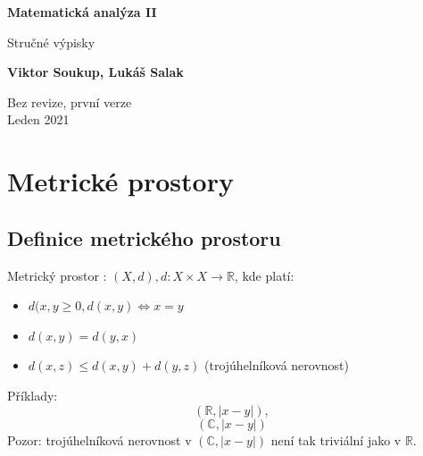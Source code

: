 \documentclass[10pt]{article}
\begin{document}
\begin{titlepage}
    \begin{center}
        \vspace*{1cm}
            
        \Huge
        \textbf{Matematická analýza II}
            
        \vspace{0.5cm}
        \LARGE
        Stručné výpisky
            
        \vspace{1.5cm}
            
        \textbf{Viktor Soukup, Lukáš Salak}
        
        \vfill
        \flushright
        \normalsize
        Bez revize, první verze \\
        Leden 2021
        
    \end{center}
\end{titlepage}

\tableofcontents
\clearpage

\section{Metrické prostory}
\subsection{Definice metrického prostoru}
\large
\hspace{1.2mm}
Metrický prostor : $(X,d), d: X \times X \rightarrow \mathbb{R}$, kde platí:

\begin{itemize}
\item{$d(x,y \geq 0, d(x,y) \iff x = y$ }
\item{$d(x,y) = d(y,x)$}
\item{$d(x,z) \leq d(x,y) + d(y,z)$ (trojúhelníková nerovnost)}
\end{itemize}
\noindent


\hspace{1.2mm}
Příklady: 
\[(\mathbb{R}, |x-y|),\]
\[(\mathbb{C},|x-y|)\]
\hspace{1.2mm}
Pozor: trojúhelníková nerovnost v $(\mathbb{C}, |x-y|)$ není tak triviální jako v $\mathbb{R}$.
\noindent
\end{document}
